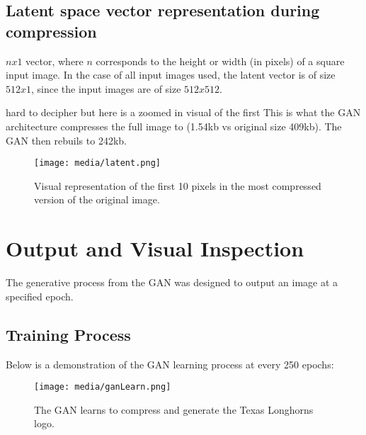 



\subsection{Latent space vector representation during compression}

$nx1$ vector, where $n$ corresponds to the height or width (in pixels)
of a square input image. In the case of all input images used, the latent vector
is of size $512x1$, since the input images are of size $512x512$.

hard to decipher but here is a zoomed in visual of the first
This is what the GAN architecture compresses the full image to (1.54kb vs original size 409kb).
The GAN then rebuils to 242kb.


\begin{figure}[H]
	\begin{center}
	\texttt{[image: media/latent.png]}
	\end{center}
	\caption[Latent Space Representation]{Visual representation of the first 10 pixels in the most compressed version of the original image.}
	\end{figure}

\section{Output and Visual Inspection}
The generative process from the GAN was designed to output an image at a specified epoch.

\subsection{Training Process}
Below is a demonstration of the GAN learning process at every 250 epochs:
\begin{figure}[H]
	\begin{center}
	\texttt{[image: media/ganLearn.png]}
	\end{center}
	\caption[GAN Training Process]{The GAN learns to compress and generate the Texas Longhorns logo.}
	\end{figure}

